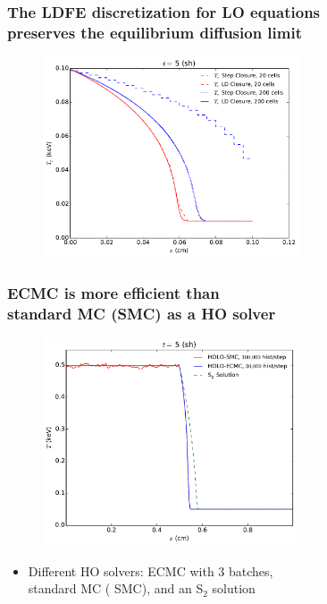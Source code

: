 \documentclass[xcolor=dvipsnames,hyperref={pdfpagelabels=false},unknownkeysallowed]{beamer}
\newcommand{\colb}[1]{{\color{blue} #1}}
\newcommand{\colr}[1]{{\color{red} #1}}
\newlength{\wideitemsep}
\let\olditem\item
\renewcommand{\item}{\setlength{\itemsep}{\wideitemsep}\olditem}
\begin{document}
\begin{frame}
    \frametitle{The LDFE discretization for LO equations \\ preserves the equilibrium diffusion limit}
\begin{figure}
    \centering
    \includegraphics[width=0.6755799\textwidth]{diff_limit_compare.pdf}
\end{figure}
\end{frame}

\begin{frame}
    \frametitle{ECMC is more efficient than\\
 standard MC (SMC) as a HO solver }
    \centering
    \begin{figure}
    \includegraphics[width=0.6699\textwidth]{two_mat_ho_compare.pdf}
    \centering
    \end{figure}
        {\small
    \begin{itemize}
        \item[] Different HO solvers: \colb{ECMC} with 3 batches, \\ standard MC (\colr{SMC}), and an S$_2$
            solution
    \end{itemize}
}
\end{frame}
\end{document}
